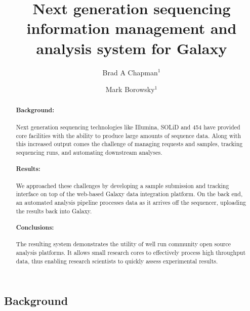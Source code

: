 \documentclass[10pt]{bmc_article}
\newenvironment{bmcformat}{\begin{raggedright}\baselineskip20pt\sloppy\setboolean{publ}{false}}{\end{raggedright}\baselineskip20pt\sloppy}
\begin{document}
\begin{bmcformat}


\title{Next generation sequencing information management and analysis
  system for Galaxy}

\author{Brad A Chapman\correspondingauthor$^{1}$%
      \and
         Mark Borowsky$^1$%
      }

\address{%
    \iid(1)Department of Molecular Biology, Simches Research Center,%
    Massachusetts General Hospital, Boston, MA 02114, USA
}%

\maketitle

\begin{abstract}
  \paragraph*{Background:} Next generation sequencing technologies
  like Illumina, SOLiD and 454 have provided core facilities with the
  ability to produce large amounts of sequence data. Along with this
  increased output comes the challenge of managing requests and
  samples, tracking sequencing runs, and automating downstream
  analyses.
  \paragraph*{Results:} We approached these challenges by developing a
  sample submission and tracking interface on top of the web-based
  Galaxy data integration platform. On the back end, an automated
  analysis pipeline processes data as it arrives off the sequencer,
  uploading the results back into Galaxy.
  \paragraph*{Conclusions:} The resulting system demonstrates the
  utility of well run community open source analysis platforms.
  It allows small research cores to effectively process high throughput
  data, thus enabling research scientists to quickly assess experimental
  results.
\end{abstract}


\section*{Background}


\end{bmcformat}
\end{document}
